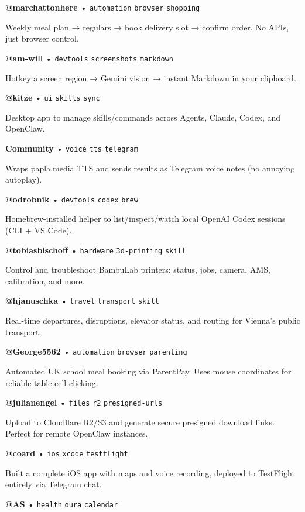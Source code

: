 \textbf{@marchattonhere} • \texttt{automation} \texttt{browser} \texttt{shopping}

Weekly meal plan → regulars → book delivery slot → confirm order. No APIs, just browser control.


\textbf{@am-will} • \texttt{devtools} \texttt{screenshots} \texttt{markdown}

Hotkey a screen region → Gemini vision → instant Markdown in your clipboard.


\textbf{@kitze} • \texttt{ui} \texttt{skills} \texttt{sync}

Desktop app to manage skills/commands across Agents, Claude, Codex, and OpenClaw.


\textbf{Community} • \texttt{voice} \texttt{tts} \texttt{telegram}

Wraps papla.media TTS and sends results as Telegram voice notes (no annoying autoplay).


\textbf{@odrobnik} • \texttt{devtools} \texttt{codex} \texttt{brew}

Homebrew-installed helper to list/inspect/watch local OpenAI Codex sessions (CLI + VS Code).


\textbf{@tobiasbischoff} • \texttt{hardware} \texttt{3d-printing} \texttt{skill}

Control and troubleshoot BambuLab printers: status, jobs, camera, AMS, calibration, and more.


\textbf{@hjanuschka} • \texttt{travel} \texttt{transport} \texttt{skill}

Real-time departures, disruptions, elevator status, and routing for Vienna's public transport.


\textbf{@George5562} • \texttt{automation} \texttt{browser} \texttt{parenting}

Automated UK school meal booking via ParentPay. Uses mouse coordinates for reliable table cell clicking.

\textbf{@julianengel} • \texttt{files} \texttt{r2} \texttt{presigned-urls}

Upload to Cloudflare R2/S3 and generate secure presigned download links. Perfect for remote OpenClaw instances.

\textbf{@coard} • \texttt{ios} \texttt{xcode} \texttt{testflight}

Built a complete iOS app with maps and voice recording, deployed to TestFlight entirely via Telegram chat.


\textbf{@AS} • \texttt{health} \texttt{oura} \texttt{calendar}


